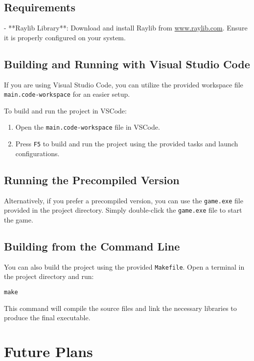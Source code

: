 \documentclass{article}
\begin{document}
\subsection{Requirements}

- **Raylib Library**: Download and install Raylib from \href{https://www.raylib.com/}{www.raylib.com}. Ensure it is properly configured on your system.

\subsection{Building and Running with Visual Studio Code}

If you are using Visual Studio Code, you can utilize the provided workspace file \texttt{main.code-workspace} for an easier setup.

To build and run the project in VSCode:

\begin{enumerate}
    \item Open the \texttt{main.code-workspace} file in VSCode.
    \item Press \texttt{F5} to build and run the project using the provided tasks and launch configurations.
\end{enumerate}

\subsection{Running the Precompiled Version}

Alternatively, if you prefer a precompiled version, you can use the \texttt{game.exe} file provided in the project directory. Simply double-click the \texttt{game.exe} file to start the game.

\subsection{Building from the Command Line}

You can also build the project using the provided \texttt{Makefile}. Open a terminal in the project directory and run:

\begin{verbatim}
make
\end{verbatim}

This command will compile the source files and link the necessary libraries to produce the final executable.

\section{Future Plans}
\end{document}
